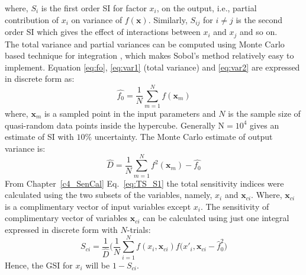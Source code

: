 where, $S_i$ is the first order SI for factor $x_i$, on the output, i.e., partial contribution of $x_i$ on variance of $f(\mathbf{x})$. Similarly, $S_{ij}$ for $i\neq j$ is the second order SI which gives the effect of interactions  between $x_i$ and $x_j$ and so on.\\
 The total variance and partial variances can be computed using Monte Carlo based technique for integration \citet{sobol2001global},
which makes Sobol's method relatively easy to implement. Equation \ref{eq:fo}, \ref{eq:var1} (total variance) and \ref{eq:var2} are expressed in discrete form as:
\begin{equation}
\label{eq:Dis_sob1}
\hat{f_0} = {\frac{1}{N}} \sum\limits_{m=1}^{N}{f({{\mathbf{x}}_{m}})}
\end{equation}
where, $\mathbf{x}_m $ is a sampled point in the input parameters and $N$ is the sample size of quasi-random data points inside the hypercube. Generally N$=10^4$ gives an estimate of SI with $10 \% $ uncertainty. The Monte Carlo estimate of output variance is:
\begin{equation}
\label{eq:Dis_sob2}
\hat{D} = {\frac{1}{N}} \sum\limits_{m=1}^{N}{f^2({{\mathbf{x}}_{m}})}- \hat{f_0}
\end{equation}
From Chapter~\ref{c4_SenCal} Eq.~\ref{eq:TS_S1} the total sensitivity indices were calculated using the two subsets of the variables, namely, $x_i$ and $\mathbf{x}_{ci}$. Where, $\mathbf{x}_{ci}$ is a complimentary vector of input variables except $x_i$. The sensitivity of complimentary vector of variables $\mathbf{x}_{ci}$ can be calculated using just one integral expressed in discrete form with $N$-trials:
\begin{equation}
\label{eq:S_ci}
S_{ci} = \displaystyle \frac{1}{\hat{D}} \bigg(\frac{1}{N}\sum_{i=1}^{N}f(x_i,\mathbf{x}_{ci})f(x'_{i},\mathbf{x}_{ci}-\hat{f}_0^2\bigg)
\end{equation}
Hence, the GSI for $x_i$ will be $1-S_{ci}$.

